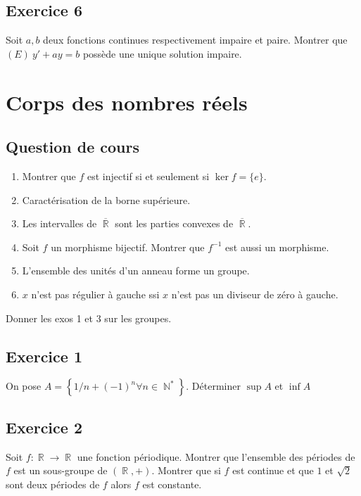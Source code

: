 \documentclass{article}
\DeclareMathOperator{\R}{\mathbb{R}}
\DeclareMathOperator{\N}{\mathbb{N}}
\begin{document}
\subsection*{Exercice 6} 

Soit $a, b$ deux fonctions continues respectivement impaire et paire. Montrer que $(E) \ y' + ay = b$ possède une unique solution impaire.  

\clearpage

\section{Corps des nombres réels} 

\subsection*{Question de cours} 

\begin{enumerate}
    \item Montrer que $f$ est injectif si et seulement si $\ker{f} = \{e\}$. 
    \item Caractérisation de la borne supérieure. 
    \item Les intervalles de $\overline{\R}$ sont les parties convexes de $\overline{\R}$. 
    \item Soit $f$ un morphisme bijectif. Montrer que $f^{-1}$ est aussi un morphisme. 
    \item L'ensemble des unités d'un anneau forme un groupe. 
    \item $x$ n'est pas régulier à gauche ssi $x$ n'est pas un diviseur de zéro à gauche. 
\end{enumerate}

Donner les exos 1 et 3 sur les groupes. 

\subsection*{Exercice 1} 

On pose $A = \left\{1/n + (-1)^n \forall n \in \N^* \right\}$. Déterminer $\sup{A} $ et $ \inf{A}$


\subsection*{Exercice 2} 

Soit $f : \R \to \R$ une fonction périodique. Montrer que l'ensemble des périodes de $f$ est un sous-groupe de $(\R, +)$. Montrer que si $f$ est continue et que $1$ et $\sqrt{2}$ sont deux périodes de $f$ alors $f$ est constante. 
\end{document}
